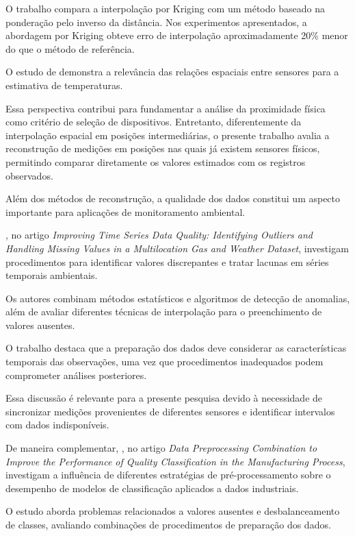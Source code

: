 O trabalho compara a interpolação por Kriging com um método baseado na ponderação pelo inverso da distância. Nos experimentos apresentados, a abordagem por Kriging obteve erro de interpolação aproximadamente 20\% menor do que o método de referência.

O estudo de  demonstra a relevância das relações espaciais entre sensores para a estimativa de temperaturas.

Essa perspectiva contribui para fundamentar a análise da proximidade física como critério de seleção de dispositivos. Entretanto, diferentemente da interpolação espacial em posições intermediárias, o presente trabalho avalia a reconstrução de medições em posições nas quais já existem sensores físicos, permitindo comparar diretamente os valores estimados com os registros observados.

Além dos métodos de reconstrução, a qualidade dos dados constitui um aspecto importante para aplicações de monitoramento ambiental.

, no artigo \textit{Improving Time Series Data Quality: Identifying Outliers and Handling Missing Values in a Multilocation Gas and Weather Dataset}, investigam procedimentos para identificar valores discrepantes e tratar lacunas em séries temporais ambientais.

Os autores combinam métodos estatísticos e algoritmos de detecção de anomalias, além de avaliar diferentes técnicas de interpolação para o preenchimento de valores ausentes.

O trabalho destaca que a preparação dos dados deve considerar as características temporais das observações, uma vez que procedimentos inadequados podem comprometer análises posteriores.

Essa discussão é relevante para a presente pesquisa devido à necessidade de sincronizar medições provenientes de diferentes sensores e identificar intervalos com dados indisponíveis.

De maneira complementar, , no artigo \textit{Data Preprocessing Combination to Improve the Performance of Quality Classification in the Manufacturing Process}, investigam a influência de diferentes estratégias de pré-processamento sobre o desempenho de modelos de classificação aplicados a dados industriais.

O estudo aborda problemas relacionados a valores ausentes e desbalanceamento de classes, avaliando combinações de procedimentos de preparação dos dados.

